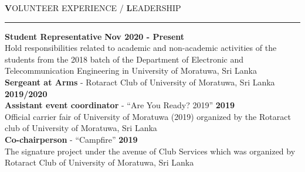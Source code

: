 \documentclass[legalpaper,11pt]{article}
\begin{document}
\setlength{\leftskip}{0pt}
\vspace{1.5cm}





\textbf{\Large V}OLUNTEER EXPERIENCE / \textbf{\Large L}EADERSHIP

\vspace{2mm}\hrule\vspace{5mm}
\setlength{\leftskip}{5mm}

\textbf{Student Representative}  \hfill\textbf{Nov 2020 - Present}\\
Hold responsibilities related to academic and non-academic activities of the students from the 2018 batch of the Department of Electronic and Telecommunication Engineering in University of Moratuwa, Sri Lanka\\

\textbf{Sergeant at Arms} - Rotaract Club of University of Moratuwa, Sri Lanka \hfill\textbf{2019/2020}\\

\textbf{Assistant event coordinator} - ``Are You Ready? 2019'' \hfill\textbf{2019}\\
Official carrier fair of University of Moratuwa (2019) organized by the Rotaract club of University of Moratuwa, Sri Lanka\\

\textbf{Co-chairperson} - ``Campfire'' \hfill\textbf{2019}\\
The signature project under the avenue of Club Services which was organized by Rotaract Club of University of Moratuwa, Sri Lanka

\setlength{\leftskip}{0pt}
\vspace{1.5cm}

\end{document}
